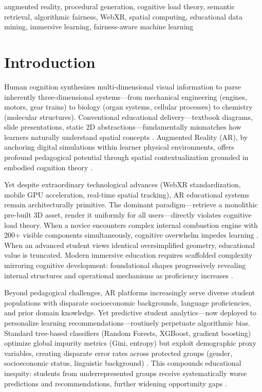 \documentclass[conference]{IEEEtran}
\begin{document}
\begin{IEEEkeywords}
augmented reality, procedural generation, cognitive load theory, semantic retrieval, algorithmic fairness, WebXR, spatial computing, educational data mining, immersive learning, fairness-aware machine learning
\end{IEEEkeywords}

\section{Introduction}

Human cognition synthesizes multi-dimensional visual information to parse inherently three-dimensional systems---from mechanical engineering (engines, motors, gear trains) to biology (organ systems, cellular processes) to chemistry (molecular structures). Conventional educational delivery---textbook diagrams, slide presentations, static 2D abstractions---fundamentally mismatches how learners naturally understand spatial concepts \cite{peters2023webxr, sweller1994cognitive}. Augmented Reality (AR), by anchoring digital simulations within learner physical environments, offers profound pedagogical potential through spatial contextualization grounded in embodied cognition theory \cite{wilson2021embodied}.

Yet despite extraordinary technological advances (WebXR standardization, mobile GPU acceleration, real-time spatial tracking), AR educational systems remain architecturally primitive. The dominant paradigm---retrieve a monolithic pre-built 3D asset, render it uniformly for all users---directly violates cognitive load theory. When a novice encounters complex internal combustion engine with 200+ visible components simultaneously, cognitive overwhelm impedes learning \cite{li2021scaffolding}. When an advanced student views identical oversimplified geometry, educational value is truncated. Modern immersive education requires scaffolded complexity mirroring cognitive development: foundational shapes progressively revealing internal structures and operational mechanisms as proficiency increases \cite{kirschner2006cognitive, brown2023ar}.

Beyond pedagogical challenges, AR platforms increasingly serve diverse student populations with disparate socioeconomic backgrounds, language proficiencies, and prior domain knowledge. Yet predictive student analytics---now deployed to personalize learning recommendations---routinely perpetuate algorithmic bias. Standard tree-based classifiers (Random Forests, XGBoost, gradient boosting) optimize global impurity metrics (Gini, entropy) but exploit demographic proxy variables, creating disparate error rates across protected groups (gender, socioeconomic status, linguistic background) \cite{thomas2022bias, wright2025fairtrees}. This compounds educational inequity: students from underrepresented groups receive systematically worse predictions and recommendations, further widening opportunity gaps \cite{noble2018algorithms}.
\end{document}
